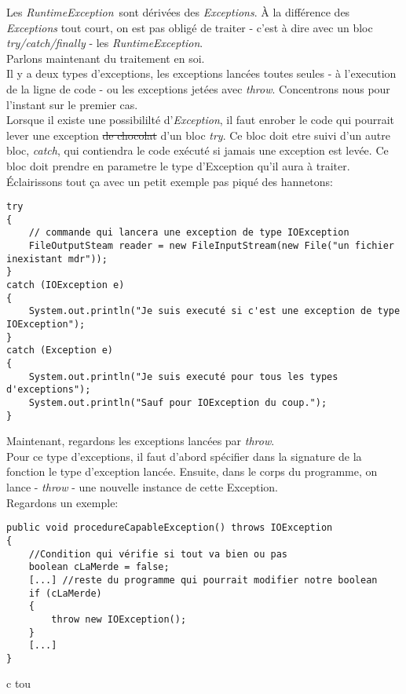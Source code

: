 \documentclass{article}
\begin{document}
Les \emph{RuntimeException} sont dérivées des \emph{Exceptions}. À la différence des \emph{Exceptions} tout court, on est pas obligé de traiter - c'est à dire avec un bloc \emph{try/catch/finally} - les \emph{RuntimeException}. \\
Parlons maintenant du traitement en soi.\\
Il y a deux types d'exceptions, les exceptions lancées toutes seules - à l'execution de la ligne de code - ou les exceptions jetées avec \emph{throw}. Concentrons nous pour l'instant sur le premier cas.\\
Lorsque il existe une possibililté d'\emph{Exception}, il faut enrober le code qui pourrait lever une exception \sout{de chocolat} d'un bloc \emph{try}. Ce bloc doit etre suivi d'un autre bloc, \emph{catch}, qui contiendra le code exécuté si jamais une exception est levée. Ce bloc doit prendre en parametre le type d'Exception qu'il aura à traiter. Éclairissons tout ça avec un petit exemple pas piqué des hannetons:
\begin{lstlisting}
try
{
	// commande qui lancera une exception de type IOException
	FileOutputSteam reader = new FileInputStream(new File("un fichier inexistant mdr"));
}
catch (IOException e)
{
	System.out.println("Je suis executé si c'est une exception de type IOException");
}
catch (Exception e)
{
	System.out.println("Je suis executé pour tous les types d'exceptions");
	System.out.println("Sauf pour IOException du coup.");
}
\end{lstlisting}
Maintenant, regardons les exceptions lancées par \emph{throw}. \\
Pour ce type d'exceptions, il faut d'abord spécifier dans la signature de la fonction le type d'exception lancée. Ensuite, dans le corps du programme, on lance - \emph{throw} - une nouvelle instance de cette Exception.\\
Regardons un exemple:
\begin{lstlisting}
public void procedureCapableException() throws IOException
{
	//Condition qui vérifie si tout va bien ou pas
	boolean cLaMerde = false;
	[...] //reste du programme qui pourrait modifier notre boolean
	if (cLaMerde)
	{
		throw new IOException();
	}
	[...]
}
\end{lstlisting}
c tou
\end{document}

